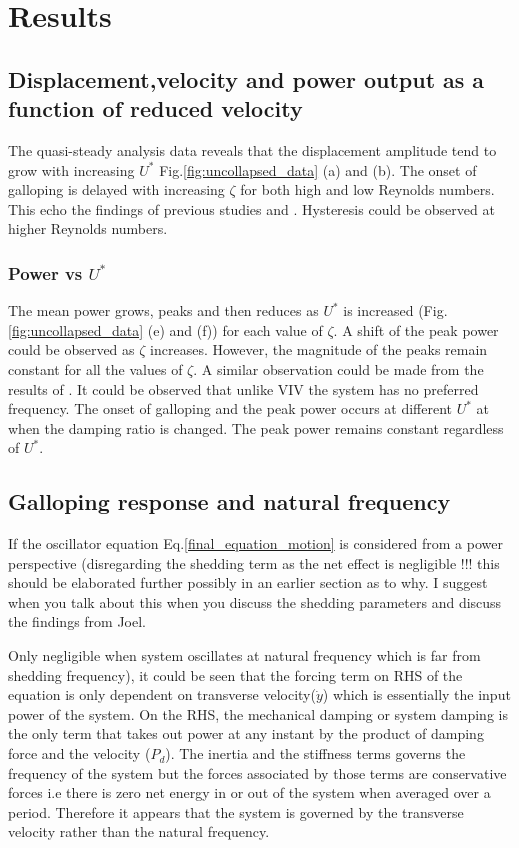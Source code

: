 
\section{Results}


\subsection{Displacement,velocity and power output as a function of reduced velocity}


 The quasi-steady analysis data reveals that the displacement amplitude tend to grow with increasing $U^*$ Fig.\ref{fig:uncollapsed_data} (a) and (b). The onset of galloping is delayed with increasing $\zeta$ for both high and low Reynolds numbers. This echo the findings of previous studies \cite{Parkinson1964} and \cite{Barrero-Gil2010a}. Hysteresis could be observed at higher Reynolds numbers. 

 
 \subsubsection*{Power vs $U^*$}
 
 The mean power grows, peaks and then reduces as $U^*$ is increased (Fig.\ref{fig:uncollapsed_data} (e) and (f)) for each value of $\zeta$. A shift of the peak power could be observed as $\zeta$ increases. However, the magnitude of the peaks remain constant for all the values of $\zeta$. A similar observation could be made from the results of \cite{Barrero-Gil2010a}. It could be observed that unlike VIV the  system has no preferred frequency. The onset of galloping and the peak power occurs at different $U^*$ at when the damping ratio is changed. The peak power remains constant regardless of $U^*$.
 
 \subsection{Galloping response and natural frequency}
 
 If the oscillator equation Eq.\eqref{final_equation_motion} is considered from a power perspective (disregarding the shedding term as the net effect is negligible !!! this should be elaborated further possibly in an earlier section as to why. I suggest when you talk about this when you discuss the shedding parameters and discuss the findings from Joel. 
 
 Only negligible when system oscillates at natural frequency which is far from shedding frequency), it could be seen that the forcing term on RHS of the equation is only dependent on transverse velocity($\dot{y}$) which is essentially the input power of the system. On the RHS, the mechanical damping or system damping is the only term that takes out power at any instant by the product of damping force and the velocity ($P_d$). The inertia and the stiffness terms governs the frequency of the system but the forces associated by those terms are conservative forces i.e there is zero net energy in or out of the system when averaged over a period. Therefore it appears that the system is governed by the transverse velocity rather than the natural frequency.
 

